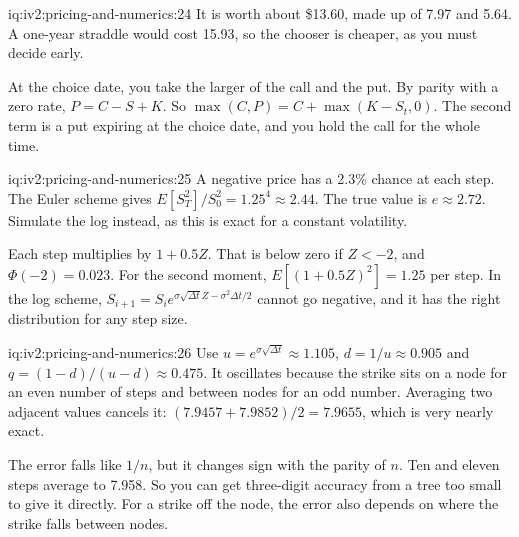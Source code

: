 \begin{solution}{iq:iv2:pricing-and-numerics:24}
It is worth about \$13.60, made up of 7.97 and 5.64. A one-year straddle would cost 15.93, so the chooser is cheaper, as you must decide early.

At the choice date, you take the larger of the call and the put. By parity with a zero rate, $P = C - S + K$. So $\max(C, P) = C + \max(K - S_t, 0)$. The second term is a put expiring at the choice date, and you hold the call for the whole time.

\end{solution}

\begin{solution}{iq:iv2:pricing-and-numerics:25}
A negative price has a 2.3\% chance at each step. The Euler scheme gives $E[S_T^2]/S_0^2 = 1.25^4 \approx 2.44$. The true value is $e \approx 2.72$. Simulate the log instead, as this is exact for a constant volatility.

Each step multiplies by $1 + 0.5Z$. That is below zero if $Z < -2$, and $\Phi(-2) = 0.023$. For the second moment, $E[(1 + 0.5Z)^2] = 1.25$ per step. In the log scheme, $S_{i+1} = S_ie^{\sigma\sqrt{\Delta t}Z - \sigma^2\Delta t/2}$ cannot go negative, and it has the right distribution for any step size.

\end{solution}

\begin{solution}{iq:iv2:pricing-and-numerics:26}
Use $u = e^{\sigma\sqrt{\Delta t}} \approx 1.105$, $d = 1/u \approx 0.905$ and $q = (1 - d)/(u - d) \approx 0.475$. It oscillates because the strike sits on a node for an even number of steps and between nodes for an odd number. Averaging two adjacent values cancels it: $(7.9457 + 7.9852)/2 = 7.9655$, which is very nearly exact.

The error falls like $1/n$, but it changes sign with the parity of $n$. Ten and eleven steps average to 7.958. So you can get three-digit accuracy from a tree too small to give it directly. For a strike off the node, the error also depends on where the strike falls between nodes.

\end{solution}

